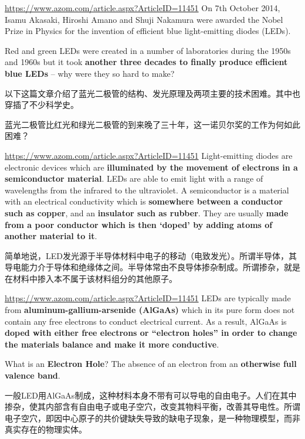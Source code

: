 \documentclass{beamer}
\newenvironment{slide}{
    \begin{frame}{\bfseries{\sectiontitle}}
}{
    \end{frame}
}
\begin{document}
\begin{slide}{\url{https://www.azom.com/article.aspx?ArticleID=11451}}
    On 7th October 2014, Isamu Akasaki, Hiroshi Amano and Shuji Nakamura were awarded the Nobel Prize in Physics for the invention of efficient blue light-emitting diodes (LEDs).
    \medskip

    Red and green LEDs were created in a number of laboratories during the 1950s and 1960s but it took \textbf{another three decades to finally produce efficient blue LEDs} -- why were they so hard to make?
    \bigskip

    以下这篇文章介绍了蓝光二极管的结构、发光原理及两项主要的技术困难。其中也穿插了不少科学史。
    \medskip

    蓝光二极管比红光和绿光二极管的到来晚了三十年，这一诺贝尔奖的工作为何如此困难？
\end{slide}

\begin{slide}{\url{https://www.azom.com/article.aspx?ArticleID=11451}}
    Light-emitting diodes are electronic devices which are \textbf{illuminated by the movement of electrons in a semiconductor material}. LEDs are able to emit light with a range of wavelengths from the infrared to the ultraviolet. A semiconductor is a material with an electrical conductivity which is \textbf{somewhere between a conductor such as copper}, and an \textbf{insulator such as rubber}. They are usually \textbf{made from a poor conductor which is then ‘doped’ by adding atoms of another material to it}.
    \bigskip

    简单地说，LED发光源于半导体材料中电子的移动（电致发光）。所谓半导体，其导电能力介于导体和绝缘体之间。半导体常由不良导体掺杂制成。所谓掺杂，就是在材料中掺入本不属于该材料组分的其他原子。
\end{slide}

\begin{slide}{\url{https://www.azom.com/article.aspx?ArticleID=11451}}
    LEDs are typically made from \textbf{aluminum-gallium-arsenide (AlGaAs)} which in its pure form does not contain any free electrons to conduct electrical current. As a result, AlGaAs is \textbf{doped with either free electrons or ``electron holes'' in order to change the materials balance and make it more conductive}.
    \medskip

    What is an \textbf{Electron Hole}? The absence of an electron from an \textbf{otherwise full valence band}.
    \bigskip

    一般LED用AlGaAs制成，这种材料本身不带有可以导电的自由电子。人们在其中掺杂，使其内部含有自由电子或电子空穴，改变其物料平衡，改善其导电性。所谓电子空穴，即因中心原子的共价键缺失导致的缺电子现象，是一种物理模型，而非真实存在的物理实体。
\end{slide}
\end{document}

